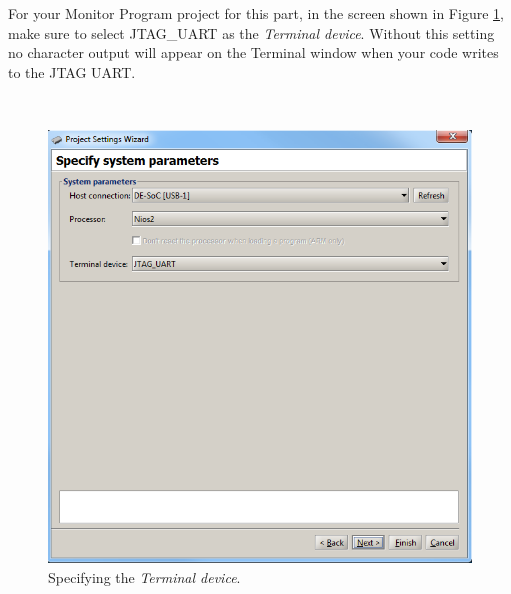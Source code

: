 \documentclass[epsfig,10pt,fullpage]{article}
\newcommand{\CommonDocsPath}{../../../../common/docs}
\begin{document}
\newpage
\noindent
For your Monitor Program project for this part, in the screen shown in Figure
\ref{fig:terminal}, make sure to select {\sf JTAG\_UART} as the {\it Terminal
device}. Without this setting no character output will appear on the Terminal window when 
your code writes to the JTAG UART.

~\\
\begin{figure}[htb]
	\begin{center}
	\includegraphics[scale=0.58]{figures/terminal.png}
	\end{center}
	\vspace{-0.25cm}\caption{Specifying the {\it Terminal device}.}
\label{fig:terminal}
\end{figure}



\end{document}
